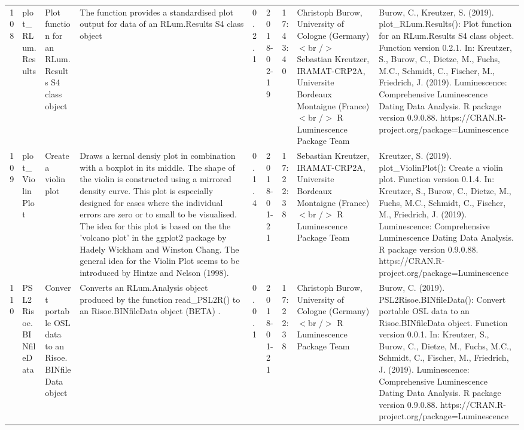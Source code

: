 \begin{table}[ht]
\begin{tabular}{rllllllll}
 \\ 
  108 & plot\_RLum.Results & Plot function for an RLum.Results S4 class object & The function provides a standardised plot output for data of an RLum.Results S4 class object & 0.2.1 & 2018-02-19 & 17:43:40
 & Christoph Burow, University of Cologne (Germany)  $<$br /$>$ Sebastian Kreutzer, IRAMAT-CRP2A, Universite Bordeaux Montaigne (France)$<$br /$>$  R Luminescence Package Team & Burow, C., Kreutzer, S. (2019). plot\_RLum.Results(): Plot function for an RLum.Results S4 class object. Function version 0.2.1. In: Kreutzer, S., Burow, C., Dietze, M., Fuchs, M.C., Schmidt, C., Fischer, M., Friedrich, J. (2019). Luminescence: Comprehensive Luminescence Dating Data Analysis. R package version 0.9.0.88. https://CRAN.R-project.org/package=Luminescence
 \\ 
  109 & plot\_ViolinPlot & Create a violin plot & Draws a kernal densiy plot in combination with a boxplot in its middle. The shape of the violin is constructed using a mirrored density curve. This plot is especially designed for cases where the individual errors are zero or to small to be visualised. The idea for this plot is based on the the 'volcano plot' in the ggplot2 package by Hadely Wickham and Winston Chang. The general idea for the Violin Plot seems to be introduced by Hintze and Nelson (1998). & 0.1.4 & 2018-01-21 & 17:22:38
 & Sebastian Kreutzer, IRAMAT-CRP2A, Universite Bordeaux Montaigne (France)$<$br /$>$  R Luminescence Package Team & Kreutzer, S. (2019). plot\_ViolinPlot(): Create a violin plot. Function version 0.1.4. In: Kreutzer, S., Burow, C., Dietze, M., Fuchs, M.C., Schmidt, C., Fischer, M., Friedrich, J. (2019). Luminescence: Comprehensive Luminescence Dating Data Analysis. R package version 0.9.0.88. https://CRAN.R-project.org/package=Luminescence
 \\ 
  110 & PSL2Risoe.BINfileData & Convert portable OSL data to an Risoe.BINfileData object & Converts an  RLum.Analysis  object produced by the function  read\_PSL2R()  to an  Risoe.BINfileData  object  (BETA) . & 0.0.1 & 2018-01-21 & 17:22:38
 & Christoph Burow, University of Cologne (Germany)$<$br /$>$  R Luminescence Package Team & Burow, C. (2019). PSL2Risoe.BINfileData(): Convert portable OSL data to an Risoe.BINfileData object. Function version 0.0.1. In: Kreutzer, S., Burow, C., Dietze, M., Fuchs, M.C., Schmidt, C., Fischer, M., Friedrich, J. (2019). Luminescence: Comprehensive Luminescence Dating Data Analysis. R package version 0.9.0.88. https://CRAN.R-project.org/package=Luminescence
 \\ 

\end{tabular}
\end{table}
